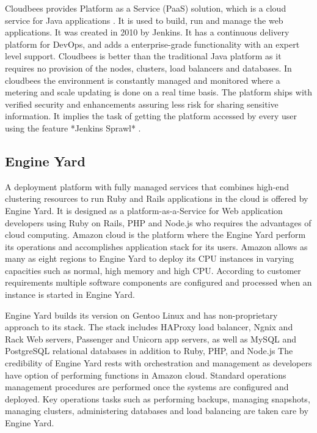     Cloudbees provides Platform as a Service (PaaS) solution, which is
    a cloud service for Java applications
    \cite{www-cloudbees-wiki}. It is used to build, run and manage
    the web applications. It was created in 2010 by Jenkins. It has a
    continuous delivery platform for DevOps, and adds a
    enterprise-grade functionality with an expert level
    support. Cloudbees is better than the traditional Java platform as
    it requires no provision of the nodes, clusters, load balancers
    and databases. In cloudbees the environment is constantly managed
    and monitored where a metering and scale updating is done on a
    real time basis. The platform ships with verified security and
    enhancements assuring less risk for sharing sensitive
    information. It implies the task of getting the platform accessed
    by every user using the feature *Jenkins Sprawl*
    \cite{www-cloudbees-webpage}.

\subsection{Engine Yard}

    A deployment platform with fully managed services that combines
    high-end clustering resources to run Ruby and Rails applications
    in the cloud is offered by Engine Yard. It is designed as a
    platform-as-a-Service for Web application developers using Ruby on
    Rails, PHP and Node.js who requires the advantages of cloud
    computing. Amazon cloud is the platform where the Engine Yard
    perform its operations and accomplishes application stack for its
    users. Amazon allows as many as eight regions to Engine Yard to
    deploy its CPU instances in varying capacities such as normal,
    high memory and high CPU. According to customer requirements
    multiple software components are configured and processed when an
    instance is started in Engine Yard.
    
    Engine Yard builds its version on Gentoo Linux and has
    non-proprietary approach to its stack. The stack includes HAProxy
    load balancer, Ngnix and Rack Web servers, Passenger and Unicorn
    app servers, as well as MySQL and PostgreSQL relational databases
    in addition to Ruby, PHP, and Node.js The credibility of Engine
    Yard rests with orchestration and management as developers have
    option of performing functions in Amazon cloud. Standard
    operations management procedures are performed once the systems
    are configured and deployed. Key operations tasks such as
    performing backups, managing snapshots, managing clusters,
    administering databases and load balancing are taken care by
    Engine Yard.
    
